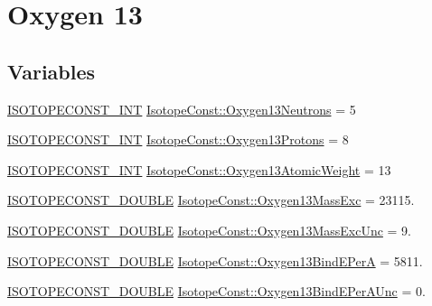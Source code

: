 \hypertarget{group___isotope_const-_oxygen-_o13}{}\section{Oxygen 13}
\label{group___isotope_const-_oxygen-_o13}
\subsection*{Variables}
\begin{DoxyCompactItemize}
\item 
\mbox{\hyperlink{group___isotope_const-_macros_ga5f18360b3e99483a35c32d789e62621c}{I\+S\+O\+T\+O\+P\+E\+C\+O\+N\+S\+T\+\_\+\+I\+NT}} \mbox{\hyperlink{group___isotope_const-_oxygen-_o13_gae3c27b41b4dfa77581927ad0dbad9e7b}{Isotope\+Const\+::\+Oxygen13\+Neutrons}} = 5
\item 
\mbox{\hyperlink{group___isotope_const-_macros_ga5f18360b3e99483a35c32d789e62621c}{I\+S\+O\+T\+O\+P\+E\+C\+O\+N\+S\+T\+\_\+\+I\+NT}} \mbox{\hyperlink{group___isotope_const-_oxygen-_o13_ga7dc4ea17562e493db140c9327d07f617}{Isotope\+Const\+::\+Oxygen13\+Protons}} = 8
\item 
\mbox{\hyperlink{group___isotope_const-_macros_ga5f18360b3e99483a35c32d789e62621c}{I\+S\+O\+T\+O\+P\+E\+C\+O\+N\+S\+T\+\_\+\+I\+NT}} \mbox{\hyperlink{group___isotope_const-_oxygen-_o13_ga8b7ffc471ccc17c45e5ebc55e1cf78fb}{Isotope\+Const\+::\+Oxygen13\+Atomic\+Weight}} = 13
\item 
\mbox{\hyperlink{group___isotope_const-_macros_ga8f45a7272ce02c0b4c65c44636ed719a}{I\+S\+O\+T\+O\+P\+E\+C\+O\+N\+S\+T\+\_\+\+D\+O\+U\+B\+LE}} \mbox{\hyperlink{group___isotope_const-_oxygen-_o13_gaa1b8e237076605bed42426158ace91c2}{Isotope\+Const\+::\+Oxygen13\+Mass\+Exc}} = 23115.
\item 
\mbox{\hyperlink{group___isotope_const-_macros_ga8f45a7272ce02c0b4c65c44636ed719a}{I\+S\+O\+T\+O\+P\+E\+C\+O\+N\+S\+T\+\_\+\+D\+O\+U\+B\+LE}} \mbox{\hyperlink{group___isotope_const-_oxygen-_o13_gaccee53dec94330330271c5db7fca76bf}{Isotope\+Const\+::\+Oxygen13\+Mass\+Exc\+Unc}} = 9.
\item 
\mbox{\hyperlink{group___isotope_const-_macros_ga8f45a7272ce02c0b4c65c44636ed719a}{I\+S\+O\+T\+O\+P\+E\+C\+O\+N\+S\+T\+\_\+\+D\+O\+U\+B\+LE}} \mbox{\hyperlink{group___isotope_const-_oxygen-_o13_gac1cd55aae3069b83072a8ad60c9f71cd}{Isotope\+Const\+::\+Oxygen13\+Bind\+E\+PerA}} = 5811.
\item 
\mbox{\hyperlink{group___isotope_const-_macros_ga8f45a7272ce02c0b4c65c44636ed719a}{I\+S\+O\+T\+O\+P\+E\+C\+O\+N\+S\+T\+\_\+\+D\+O\+U\+B\+LE}} \mbox{\hyperlink{group___isotope_const-_oxygen-_o13_ga9aec64a7d6fb15c7dfd14f8e4bb85b31}{Isotope\+Const\+::\+Oxygen13\+Bind\+E\+Per\+A\+Unc}} = 0.

\end{DoxyCompactItemize}
